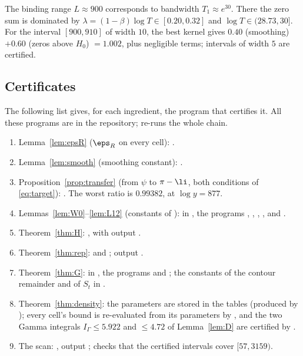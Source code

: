 The binding range $L\approx 900$ corresponds to bandwidth $T_1 \approx e^{30}$.
There the zero sum is dominated by $\lambda = (1-\beta)\log T \in [0.20, 0.32]$ and $\log T\in(28.73, 30]$.
For the interval $[900,910]$ of width $10$, the best kernel gives $0.40$ (smoothing) $+ 0.60$ (zeros above $H_0$) $= 1.002$, plus negligible terms; intervals of width $5$ are certified.

\subsection{Certificates}
The following list gives, for each ingredient, the program that certifies it.
All these programs are in the repository;  re-runs the whole chain.
\begin{enumerate}
\item Lemma~\ref{lem:epsR} ($\eps_R$ on every cell): .
\item Lemma~\ref{lem:smooth} (smoothing constant): .
\item Proposition~\ref{prop:transfer} (from $\psi$ to $\pi - \li$, both conditions of \eqref{eq:target}): .
  The worst ratio is $0.99382$, at $\log y = 877$.
\item Lemmas~\ref{lem:W0}--\ref{lem:L12} (constants of \cite{BTY}): in , the programs , , , ,  and .
\item Theorem~\ref{thm:H}: , with output .
\item Theorem~\ref{thm:rep}:  and ; output .
\item Theorem~\ref{thm:G}: in , the programs  and ; the constants of the contour remainder and of $S_t$ in .
\item Theorem~\ref{thm:density}: the parameters are stored in the tables  (produced by ); every cell's bound is re-evaluated from its parameters by , and the two Gamma integrals $I_\Gamma \le 5.922$ and $\le 4.72$ of Lemma~\ref{lem:D} are certified by .
\item The scan: , output ;  checks that the certified intervals cover $[57,3159)$.
\end{enumerate}

